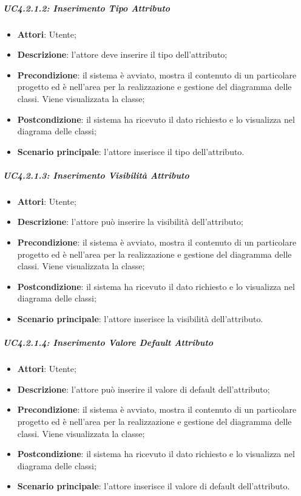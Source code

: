 \subparagraph{UC4.2.1.2: Inserimento Tipo Attributo}
\label{UC4.2.1.2}
\begin{itemize}
	\item \textbf{Attori}: Utente;
	\item \textbf{Descrizione}: l'attore deve inserire il tipo dell'attributo;
	\item \textbf{Precondizione}: il sistema è avviato, mostra il contenuto di un particolare progetto ed è nell'area per la realizzazione e gestione del diagramma delle classi. Viene visualizzata la classe;
	\item \textbf{Postcondizione}: il sistema ha ricevuto il dato richiesto e lo visualizza nel diagrama delle classi;
	\item \textbf{Scenario principale}: l'attore inserisce il tipo dell'attributo.
\end{itemize}

\subparagraph{UC4.2.1.3: Inserimento Visibilità Attributo}
\label{UC4.2.1.3}
\begin{itemize}
	\item \textbf{Attori}: Utente;
	\item \textbf{Descrizione}: l'attore può inserire la visibilità dell'attributo;
	\item \textbf{Precondizione}: il sistema è avviato, mostra il contenuto di un particolare progetto ed è nell'area per la realizzazione e gestione del diagramma delle classi. Viene visualizzata la classe;
	\item \textbf{Postcondizione}: il sistema ha ricevuto il dato richiesto e lo visualizza nel diagrama delle classi;
	\item \textbf{Scenario principale}: l'attore inserisce la visibilità dell'attributo.
\end{itemize}

\subparagraph{UC4.2.1.4: Inserimento Valore Default Attributo}
\label{UC4.2.1.4}
\begin{itemize}
	\item \textbf{Attori}: Utente;
	\item \textbf{Descrizione}: l'attore può inserire il valore di default dell'attributo;
	\item \textbf{Precondizione}: il sistema è avviato, mostra il contenuto di un particolare progetto ed è nell'area per la realizzazione e gestione del diagramma delle classi. Viene visualizzata la classe;
	\item \textbf{Postcondizione}: il sistema ha ricevuto il dato richiesto e lo visualizza nel diagrama delle classi;
	\item \textbf{Scenario principale}: l'attore inserisce  il valore di default dell'attributo.
\end{itemize}

